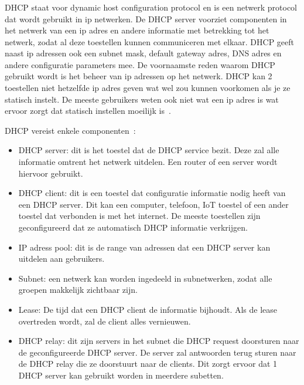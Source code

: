 \subsubsection{}
\label{subsubsec:DHCP-server}
DHCP staat voor dynamic host configuration protocol en is een netwerk protocol dat wordt gebruikt in ip netwerken. De DHCP server voorziet componenten in het netwerk van een ip adres en andere informatie met betrekking tot het netwerk, zodat al deze toestellen kunnen communiceren met elkaar. DHCP geeft naast ip adressen ook een subnet mask, default gateway adres, DNS adres en andere configuratie parameters mee. De voornaamste reden waarom DHCP gebruikt wordt is het beheer van ip adressen op het netwerk. DHCP kan 2 toestellen niet hetzelfde ip adres geven wat wel zou kunnen voorkomen als je ze statisch instelt. De meeste gebruikers weten ook niet wat een ip adres is wat ervoor zorgt dat statisch instellen moeilijk is~\autocite{Kerravala2018}.

DHCP vereist enkele componenten~\autocite{Kerravala2018}:
 \begin{itemize}
     \item DHCP server: dit is het toestel dat de DHCP service bezit. Deze zal alle informatie omtrent het netwerk uitdelen. Een router of een server wordt hiervoor gebruikt.
     \item DHCP client: dit is een toestel dat configuratie informatie nodig heeft van een DHCP server. Dit kan een computer, telefoon, IoT toestel of een ander toestel dat verbonden is met het internet. De meeste toestellen zijn geconfigureerd dat ze automatisch DHCP informatie verkrijgen.
     \item IP adress pool: dit is de range van adressen dat een DHCP server kan uitdelen aan gebruikers.
     \item Subnet: een netwerk kan worden ingedeeld in subnetwerken, zodat alle groepen makkelijk zichtbaar zijn.
     \item Lease: De tijd dat een DHCP client de informatie bijhoudt. Als de lease overtreden wordt, zal de client alles vernieuwen.
     \item DHCP relay: dit zijn servers in het subnet die DHCP request doorsturen naar de geconfigureerde DHCP server. De server zal antwoorden terug sturen naar de DHCP relay die ze doorstuurt naar de clients. Dit zorgt ervoor dat 1 DHCP server kan gebruikt worden in meerdere subetten.
 \end{itemize}

